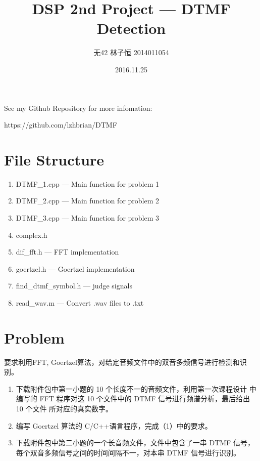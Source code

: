 \documentclass[UTF8,a4paper,twocolumn]{ctexart}
\author{无42 林子恒 2014011054}
\title{DSP 2nd Project --- DTMF Detection}
\date{2016.11.25}
\begin{document}
  \maketitle
  \thispagestyle{empty}
	See my Github Repository for more infomation:
	
	https://github.com/lzhbrian/DTMF

\tableofcontents

\section*{File Structure}

\begin{enumerate}

\item DTMF\_1.cpp --- Main function for problem 1
\item DTMF\_2.cpp --- Main function for problem 2
\item DTMF\_3.cpp --- Main function for problem 3
\item complex.h 
\item dif\_fft.h --- FFT implementation
\item goertzel.h --- Goertzel implementation
\item find\_dtmf\_symbol.h --- judge signals
\item read\_wav.m --- Convert .wav files to .txt

\end{enumerate}

\newpage


\section{Problem}
要求利用FFT, Goertzel算法，对给定音频文件中的双音多频信号进行检测和识别。

\begin{enumerate}

\item 下载附件包中第一小题的 10 个长度不一的音频文件，利用第一次课程设计 中编写的 FFT 程序对这 10 个文件中的 DTMF 信号进行频谱分析，最后给出 10 个文件 所对应的真实数字。
\item 编写 Goertzel 算法的 C/C++语言程序，完成（1）中的要求。
\item 下载附件包中第二小题的一个长音频文件，文件中包含了一串 DTMF 信号， 每个双音多频信号之间的时间间隔不一，对本串 DTMF 信号进行识别。

\end{enumerate}
\end{document}
